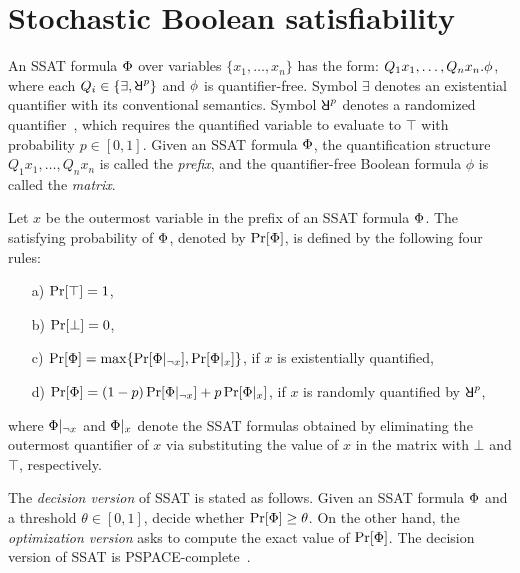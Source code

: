 \section{Stochastic Boolean satisfiability}
\label{sect:ssat}

An SSAT formula $\Phi$ over variables $\{x_1,\ldots,x_n\}$ has the form:
$Q_1x_1,\ldots,Q_nx_n.\phi$,
where each $Q_i\in\{\exists,\random{p}\}$ and $\phi$ is quantifier-free.
Symbol $\exists$ denotes an existential quantifier with its conventional semantics.
Symbol $\random{p}$ denotes a randomized quantifier~\cite{Papadimitriou1985}, which requires
the quantified variable to evaluate to $\top$ with probability $p\in[0,1]$.
Given an SSAT formula $\Phi$, the quantification structure $Q_1 x_1, \ldots, Q_n x_n$ is called the \emph{prefix},
and the quantifier-free Boolean formula $\phi$ is called the \emph{matrix}.

Let $x$ be the outermost variable in the prefix of an SSAT formula $\Phi$.
The satisfying probability of $\Phi$, denoted by $\Pr[\Phi]$, is defined by the following four rules:
\begin{enumerate}
    \item[a)] $\Pr[\top]=1$,
    \item[b)] $\Pr[\bot]=0$,
    \item[c)] $\Pr[\Phi]=\max\{\Pr[\Phi|_{\lnot x}],\Pr[\Phi|_{x}]\}$, if $x$ is existentially quantified,
    \item[d)] $\Pr[\Phi]=(1-p)\Pr[\Phi|_{\lnot x}]+p\Pr[\Phi|_{x}]$, if $x$ is randomly quantified by $\random{p}$,
\end{enumerate}
where $\Phi|_{\lnot x}$ and $\Phi|_{x}$ denote the SSAT formulas obtained by eliminating the outermost quantifier of $x$ via substituting the value of $x$ in the matrix with $\bot$ and $\top$, respectively.

The \textit{decision version} of SSAT is stated as follows.
Given an SSAT formula $\Phi$ and a threshold $\theta\in[0,1]$, decide whether $\Pr[\Phi]\geq\theta$.
On the other hand, the \textit{optimization version} asks to compute the exact value of $\Pr[\Phi]$.
The decision version of SSAT is PSPACE-complete~\cite{Papadimitriou1985}.